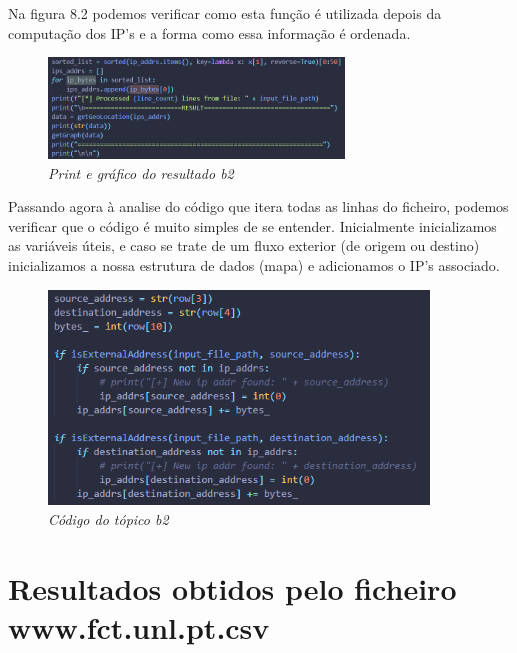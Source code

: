Na figura 8.2 podemos verificar como esta função é utilizada depois da computação dos IP's e a forma como essa informação é ordenada.

\begin{figure}[h!]
    \label{high}
    \centering
    \includegraphics[width=0.7\textwidth]{Images/b2/result.png}
    \caption{\textit{\textit{Print} e gráfico do resultado b2}}
\end{figure}

Passando agora à analise do código que itera todas as linhas do ficheiro, podemos verificar que o código é muito simples de se entender. Inicialmente inicializamos as variáveis úteis, e caso se trate de um fluxo exterior (de origem ou destino) inicializamos a nossa estrutura de dados (mapa) e adicionamos o IP's associado. 

\begin{figure}[h!]
    \label{high}
    \centering
    \includegraphics[width=0.9\textwidth]{Images/b2/b2.png}
    \caption{\textit{Código do tópico b2}}
\end{figure}

\newpage

\section{Resultados obtidos pelo ficheiro www.fct.unl.pt.csv}

